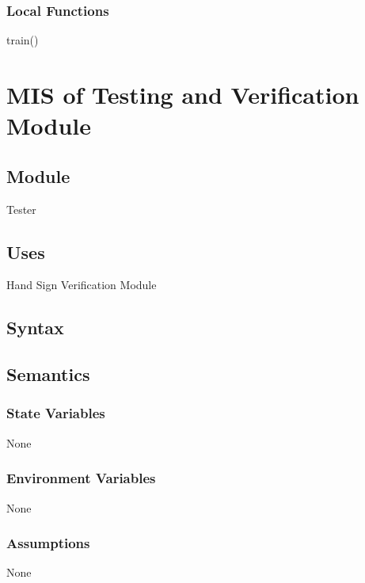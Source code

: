 \documentclass[12pt, titlepage]{article}
\begin{document}
\subsubsection{Local Functions}
train()

\section{MIS of Testing and Verification Module} \label{Module} 
\subsection{Module}
Tester
\subsection{Uses}
Hand Sign Verification Module
\subsection{Syntax}
\subsection{Semantics}
\subsubsection{State Variables}
None
\subsubsection{Environment Variables}
None
\subsubsection{Assumptions}
None
\end{document}
